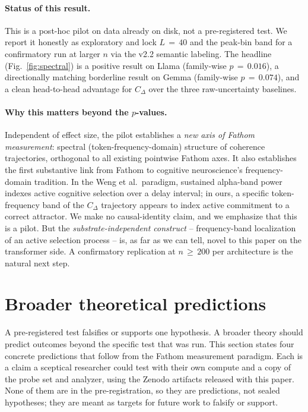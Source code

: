 \documentclass[11pt,letterpaper]{article}
\begin{document}
\paragraph{Status of this result.}
This is a post-hoc pilot on data already on disk, not a pre-registered
test. We report it honestly as exploratory and lock $L\,=\,40$ and the
peak-bin band for a confirmatory run at larger $n$ via the v2.2 semantic
labeling. The headline (Fig.~\ref{fig:spectral}) is a positive result
on Llama (family-wise $p\,=\,0.016$), a directionally matching
borderline result on Gemma (family-wise $p\,=\,0.074$), and a clean
head-to-head advantage for $C_\Delta$ over the three raw-uncertainty
baselines.

\paragraph{Why this matters beyond the $p$-values.}
Independent of effect size, the pilot establishes a \emph{new axis of
Fathom measurement}: spectral (token-frequency-domain) structure of
coherence trajectories, orthogonal to all existing pointwise Fathom
axes. It also establishes the first substantive link from Fathom to
cognitive neuroscience's frequency-domain tradition. In the Weng et
al.\ paradigm, sustained alpha-band power indexes active cognitive
selection over a delay interval; in ours, a specific token-frequency
band of the $C_\Delta$ trajectory appears to index active commitment
to a correct attractor. We make no causal-identity claim, and we
emphasize that this is a pilot. But the \emph{substrate-independent
construct} -- frequency-band localization of an active selection
process -- is, as far as we can tell, novel to this paper on the
transformer side. A confirmatory replication at $n\,\geq\,200$ per
architecture is the natural next step.

\section{Broader theoretical predictions}
\label{sec:predictions}

A pre-registered test falsifies or supports one hypothesis. A broader
theory should predict outcomes beyond the specific test that was run.
This section states four concrete predictions that follow from the
Fathom measurement paradigm. Each is a claim a sceptical researcher
could test with their own compute and a copy of the probe set and
analyzer, using the Zenodo artifacts released with this paper. None of
them are in the pre-registration, so they are predictions, not sealed
hypotheses; they are meant as targets for future work to falsify or
support.
\end{document}
